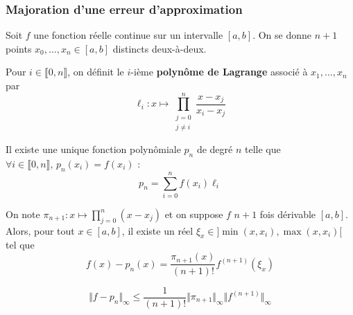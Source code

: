   \subsubsection{Majoration d'une erreur d'approximation}


  Soit $f$ une fonction réelle continue sur un intervalle $[a,b]$. On se donne $n+1$ points $x_0, \dots, x_n \in [a,b]$ distincts deux-à-deux.

  \begin{definition}
    Pour $i \in \llbracket 0, n \rrbracket$, on définit le $i$-ième \textbf{polynôme de Lagrange} associé à $x_1, \dots, x_n$ par
    \[ \ell_i : x \mapsto \prod_{\substack{j=0\\j \neq i}}^n \frac{x-x_j}{x_i-x_j} \]
  \end{definition}

  \begin{theorem}
    Il existe une unique fonction polynômiale $p_n$ de degré $n$ telle que $\forall i \in \llbracket 0, n \rrbracket, \, p_n(x_i) = f(x_i)$ :
    \[ p_n = \sum_{i=0}^n f(x_i) \ell_i \]
  \end{theorem}

  \begin{theorem}
    On note $\pi_{n+1} : x \mapsto \prod_{j=0}^{n} (x-x_j)$ et on suppose $f$ $n+1$ fois dérivable $[a,b]$. Alors, pour tout $x \in [a,b]$, il existe un réel $\xi_x \in ]\min(x,x_i),\max(x,x_i)[$ tel que
    \[ f(x)-p_n(x) = \frac{\pi_{n+1}(x)}{(n+1)!} f^{(n+1)}(\xi_x) \]
  \end{theorem}

  \begin{corollary}
    \[ \Vert f - p_n \Vert_\infty \leq \frac{1}{(n+1)!} \Vert \pi_{n+1} \Vert_\infty \Vert f^{(n+1)} \Vert_\infty \]
  \end{corollary}


